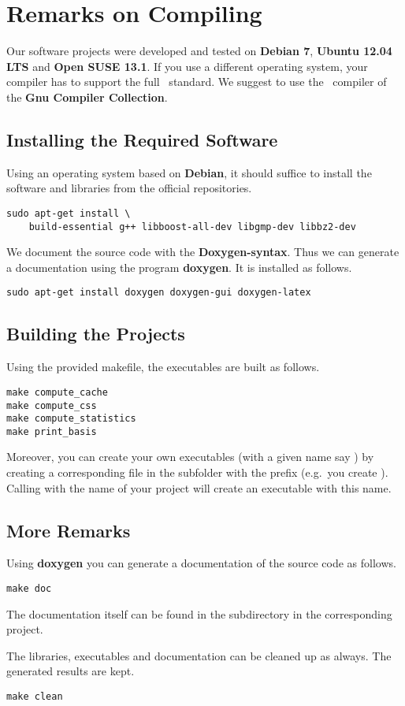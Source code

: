 \section{Remarks on Compiling}
\label{program:compiling}

Our software projects were developed and tested on {\bfseries Debian 7}, {\bfseries Ubuntu 12.04 LTS} and {\bfseries Open SUSE 13.1}.
If you use a different operating system, your compiler has to support the full \cppeleven\ standard.
We suggest to use the \cpp\ compiler of the {\bfseries Gnu Compiler Collection}.

\subsection{Installing the Required Software}
Using an operating system based on {\bfseries Debian}, it should suffice to install the software and libraries from the official repositories.
\begin{lstlisting}
sudo apt-get install \
    build-essential g++ libboost-all-dev libgmp-dev libbz2-dev
\end{lstlisting}
We document the source code with the {\bfseries Doxygen-syntax}.
Thus we can generate a documentation using the program {\bfseries doxygen}.
It is installed as follows.
\begin{lstlisting}
sudo apt-get install doxygen doxygen-gui doxygen-latex
\end{lstlisting}

\subsection{Building the Projects}
Using the provided makefile, the executables are built as follows.
\begin{lstlisting}
make compute_cache
make compute_css
make compute_statistics
make print_basis
\end{lstlisting}
Moreover, you can create your own executables (with a given name say )
by creating a corresponding \progname{.cpp} file in the subfolder \progname{./kappa} with the prefix  (e.g.\ you create ).
Calling \progname{make} with the name of your project will create an executable with this name.

\subsection{More Remarks}
Using {\bfseries doxygen} you can generate a documentation of the source code as follows. 
\begin{lstlisting}
make doc
\end{lstlisting}
The documentation itself can be found in the subdirectory  in the corresponding project.

The libraries, executables and documentation can be cleaned up as always.
The generated results are kept.
\begin{lstlisting}
make clean
\end{lstlisting}
